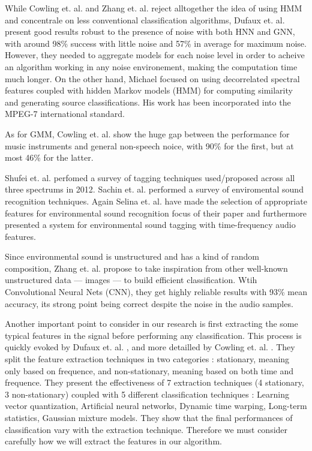 \documentclass{article} %
\begin{document}
While Cowling et. al. \cite{cite1} and Zhang et. al. \cite{cite2} reject alltogether the idea of using HMM and concentrale on less conventional classification algorithms, Dufaux et. al. \cite{cite3} present good results robust to the presence of noise with both HNN and GNN, with around 98\% success with little noise and 57\% in average for maximum noise. However, they needed to aggregate models for each noise level in order to acheive an algorithm working in any noise environement, making the computation time much longer. On the other hand, Michael \cite{cite4} focused on using decorrelated spectral features coupled with hidden Markov models (HMM) for computing similarity and generating source classifications. His work has been incorporated into the MPEG-7 international standard. 

As for GMM, Cowling et. al. \cite{cite1} show the huge gap between the performance for music instruments and general non-speech noice, with 90\% for the first, but at most 46\% for the latter.
 
Shufei et. al. \cite{cite5} perfomed a survey of tagging techniques used/proposed across all three spectrums in 2012. Sachin et. al. \cite{cite6} performed a survey of enviromental sound recognition techniques. Again Selina et. al. \cite{cite7} have made the selection of appropriate features for environmental sound recognition focus of their paper and furthermore presented \cite{cite8} a system for environmental sound tagging with time-frequency audio features.

Since environmental sound is unstructured and has a kind of random composition, Zhang et. al. \cite{cite2} propose to take inspiration from other well-known unstructured data --- images --- to build efficient classification. Wtih Convolutional Neural Nets (CNN), they get highly reliable results with 93\% mean accuracy, its strong point being correct despite the noise in the audio samples.

Another important point to consider in our research is first extracting the some typical features in the signal before performing any classification. This process is quickly evoked by Dufaux et. al. \cite{cite3}, and more detailled by Cowling et. al. \cite{cite1}. They split the feature extraction techniques in two categories : stationary, meaning only based on frequence, and non-stationary, meaning based on both time and frequence. They present the effectiveness of 7 extraction techniques (4 stationary, 3 non-stationary) coupled with 5 different classification techniques : Learning vector quantization, Artificial neural networks, Dynamic time warping, Long-term statistics, Gaussian mixture models. They show that the final performances of classification vary with the extraction technique. Therefore we must consider carefully how we will extract the features in our algorithm.
\end{document}
